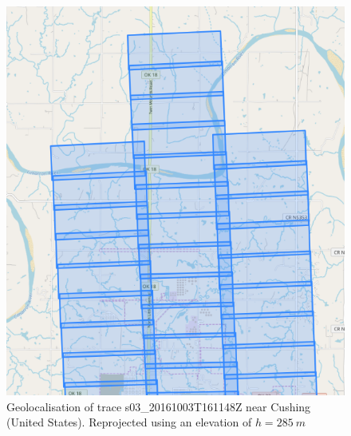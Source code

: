 \documentclass[paper=a4, fontsize=11pt, onecolumn, tikz, dvipsnames, svgnames, x11names]{article}
\begin{document}
\begin{figure}[H]
    \centering
    \includegraphics[height = 0.7\textheight]{trace_8Z.png}
    \caption{Geolocalisation of trace s03\_20161003T161148Z near Cushing (United States). Reprojected using an elevation of $h=285~m$}
    \label{fig_trace_8Z}
\end{figure}
\end{document}
